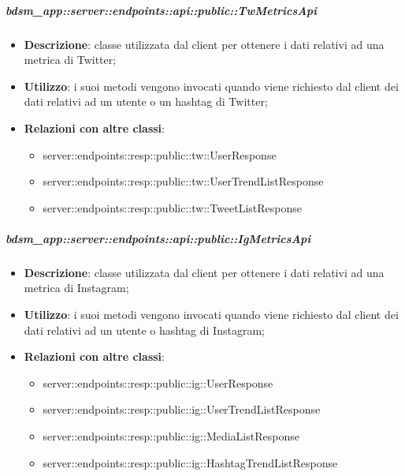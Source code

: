     \subparagraph{bdsm\_app::server::endpoints::api::public::TwMetricsApi} %
    \label{subp:bdsm_app_server_endpoints_api_public_twmetricsapi}
    \begin{itemize}
      \item \textbf{Descrizione}: classe utilizzata dal client per ottenere i dati relativi ad una metrica di Twitter;
      \item \textbf{Utilizzo}: i suoi metodi vengono invocati quando viene richiesto dal client dei dati relativi ad un utente o un hashtag di Twitter;
      \item \textbf{Relazioni con altre classi}:
        \begin{itemize}
          \item server::endpoints::resp::public::tw::UserResponse
          \item server::endpoints::resp::public::tw::UserTrendListResponse
          \item server::endpoints::resp::public::tw::TweetListResponse
        \end{itemize}
      \end{itemize}
    
    \subparagraph{bdsm\_app::server::endpoints::api::public::IgMetricsApi} %
    \label{subp:bdsm_app_server_endpoints_api_public_igmetricsapi}
    \begin{itemize}
      \item \textbf{Descrizione}: classe utilizzata dal client per ottenere i dati relativi ad una metrica di Instagram;
      \item \textbf{Utilizzo}: i suoi metodi vengono invocati quando viene richiesto dal client dei dati relativi ad un utente o hashtag di Instagram;
      \item \textbf{Relazioni con altre classi}:
        \begin{itemize}
          \item server::endpoints::resp::public::ig::UserResponse
          \item server::endpoints::resp::public::ig::UserTrendListResponse
          \item server::endpoints::resp::public::ig::MediaListResponse
          \item server::endpoints::resp::public::ig::HashtagTrendListResponse
        \end{itemize}
      \end{itemize}


